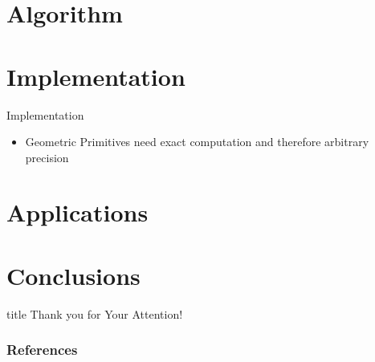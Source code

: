 \documentclass[aspectratio=169]{beamer}
\begin{document}
\section{Algorithm}

\section{Implementation}
\begin{frame}{Implementation}
  \begin{itemize}
    \item Geometric Primitives need exact computation and therefore arbitrary precision
  \end{itemize}
\end{frame}

\section{Applications}

\section{Conclusions}

\begin{frame}
  \vfill
  \centering
  \begin{beamercolorbox}[sep=8pt,center,shadow=true,rounded=true]{title}
    Thank you for Your Attention!%
    \par%
  \end{beamercolorbox}
  \vfill
\end{frame}

\begin{frame}
  \frametitle{References}
  \AtNextBibliography{\tiny}
  \begin{multicols}{2}
    \nocite{*}
    \printbibliography
  \end{multicols}
\end{frame}
\end{document}
